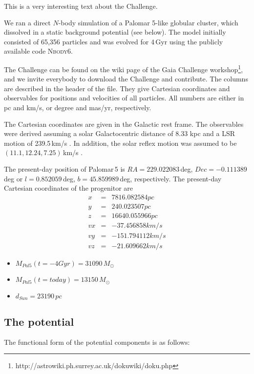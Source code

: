 This is a very interesting text about the Challenge.

We ran a direct $N$-body simulation of a Palomar 5-like globular cluster, which dissolved in a static background potential (see below). The model initially consisted of 65,356 particles and was evolved for 4\,Gyr using the publicly available code \textsc{Nbody6}. 

The Challenge can be found on the wiki page of the Gaia Challenge workshop\footnote{http://astrowiki.ph.surrey.ac.uk/dokuwiki/doku.php}, and we invite everybody to download the Challenge and contribute. The columns are described in the header of the file. They give Cartesian coordinates and observables for positions and velocities of all particles. All numbers are either in pc and km/s, or degree and mas/yr, respectively. 

The Cartesian coordinates are given in the Galactic rest frame. The observables were derived assuming a solar Galactocentric distance of 8.33 kpc and a LSR motion of 239.5\,km/s \citep{Gillessen09}. In addition, the solar reflex motion was assumed to be $(11.1, 12.24, 7.25)$\,km/s \citep{Schonrich10}.  

The present-day position of Palomar\,5 is $RA = 229.022083$\,deg, $Dec = -0.111389$\,deg or $l = 0.852059$\,deg, $b = 45.859989$\,deg, respectively. The present-day Cartesian coordinates of the progenitor are 
\begin{eqnarray}
  x &=& 7816.082584 pc\\
  y &=& 240.023507 pc\\
  z &=& 16640.055966 pc\\
  vx &=& -37.456858 km/s\\
  vy &=& -151.794112 km/s\\
  vz &=& -21.609662 km/s
\end{eqnarray}

\begin{itemize}
  \item $M_{Pal5}(t=-4 Gyr) = 31090\,M_{\odot}$
  \item $M_{Pal5}(t=today) = 13150\,M_{\odot}$
  \item $d_{Sun} = 23190\,pc$
\end{itemize}



\subsection{The potential}

The functional form of the potential components is as follows:

